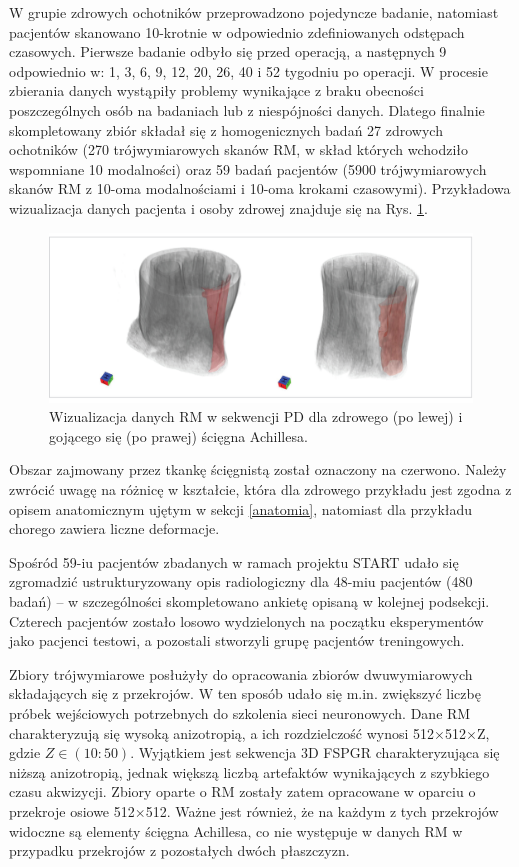 W grupie zdrowych ochotników przeprowadzono pojedyncze badanie, natomiast pacjentów skanowano 10-krotnie w odpowiednio zdefiniowanych odstępach czasowych. Pierwsze badanie odbyło się przed operacją, a następnych 9 odpowiednio w: 1, 3, 6, 9, 12, 20, 26, 40 i 52 tygodniu po operacji. W procesie zbierania danych wystąpiły problemy wynikające z braku obecności poszczególnych osób na badaniach lub z niespójności danych. Dlatego finalnie skompletowany zbiór składał się z homogenicznych badań 27 zdrowych ochotników (270 trójwymiarowych skanów RM, w skład których wchodziło wspomniane 10 modalności) oraz 59 badań pacjentów (5900 trójwymiarowych skanów RM z 10-oma modalnościami i 10-oma krokami czasowymi). Przykładowa wizualizacja danych pacjenta i osoby zdrowej znajduje się na Rys. \ref{fig:MRI_sample}. 
\begin{figure}[h!]
	\includegraphics[width=\textwidth]{figures/Data_MRI_sample.jpg}
	\caption{Wizualizacja danych RM w sekwencji PD dla zdrowego (po lewej) i gojącego się (po prawej) ścięgna Achillesa.}
	 \label{fig:MRI_sample}
\end{figure}
Obszar zajmowany przez tkankę ścięgnistą został oznaczony na czerwono. Należy zwrócić uwagę na różnicę w kształcie, która dla zdrowego przykładu jest zgodna z opisem anatomicznym ujętym w sekcji \ref{anatomia}, natomiast dla przykładu chorego zawiera liczne deformacje. 

Spośród 59-iu pacjentów zbadanych w ramach projektu START udało się zgromadzić ustrukturyzowany opis radiologiczny dla 48-miu pacjentów (480 badań) -- w szczególności skompletowano ankietę opisaną w kolejnej podsekcji. Czterech pacjentów zostało losowo wydzielonych na początku eksperymentów jako pacjenci testowi, a pozostali stworzyli grupę pacjentów treningowych.

Zbiory trójwymiarowe posłużyły do opracowania zbiorów dwuwymiarowych składających się z przekrojów. W ten sposób udało się m.in. zwiększyć liczbę próbek wejściowych potrzebnych do szkolenia sieci neuronowych. Dane RM charakteryzują się wysoką anizotropią, a ich rozdzielczość wynosi 512$\times$512$\times$Z, gdzie $Z\in(10:50)$. Wyjątkiem jest sekwencja 3D FSPGR charakteryzująca się niższą anizotropią, jednak większą liczbą artefaktów wynikających z szybkiego czasu akwizycji. Zbiory oparte o RM zostały zatem opracowane w oparciu o przekroje osiowe 512$\times$512. Ważne jest również, że na każdym z tych przekrojów widoczne są elementy ścięgna Achillesa, co nie występuje w danych RM w przypadku przekrojów z pozostałych dwóch płaszczyzn.

